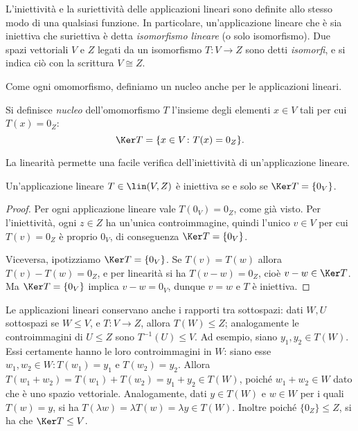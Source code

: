 L'iniettività e la suriettività delle applicazioni lineari sono definite allo stesso modo di una qualsiasi funzione.
In particolare, un'applicazione lineare che è sia iniettiva che suriettiva è detta \emph{isomorfismo lineare} (o solo isomorfismo).
Due spazi vettoriali $V$ e $Z$ legati da un isomorfismo $T\colon V\to Z$ sono detti \emph{isomorfi}, e si indica ciò con la scrittura $V\cong Z$.

Come ogni omomorfismo, definiamo un nucleo anche per le applicazioni lineari.
\begin{definizione} \label{d:nucleo-applicazione-lineare}
	Si definisce \emph{nucleo} dell'omomorfismo $T$ l'insieme degli elementi $x\in V$ tali per cui $T(x)=0_Z$:
	\begin{equation*}
		\Ker T=\{x\in V\colon T(x)=0_Z\}.
	\end{equation*}
\end{definizione}
La linearità permette una facile verifica dell'iniettività di un'applicazione lineare.
\begin{teorema} \label{t:iniettivita-nucleo}
	Un'applicazione lineare $T\in\lin(V,Z)$ è iniettiva se e solo se $\Ker T=\{0_V\}$.
\end{teorema}
\begin{proof}
	Per ogni applicazione lineare vale $T(0_V)=0_Z$, come già visto.
	Per l'iniettività, ogni $z\in Z$ ha un'unica controimmagine, quindi l'unico $v\in V$ per cui $T(v)=0_Z$ è proprio $0_V$, di conseguenza $\Ker T=\{0_V\}$.

	Viceversa, ipotizziamo $\Ker T=\{0_V\}$.
	Se $T(v)=T(w)$ allora $T(v)-T(w)=0_Z$, e per linearità si ha $T(v-w)=0_Z$, cioè $v-w\in\Ker T$.
	Ma $\Ker T=\{0_V\}$ implica $v-w=0_V$, dunque $v=w$ e $T$ è iniettiva.
\end{proof}
Le applicazioni lineari conservano anche i rapporti tra sottospazi: dati $W,U$ sottospazi se $W\leq V$, e $T\colon V\to Z$, allora $T(W)\leq Z$; analogamente le controimmagini di $U\leq Z$ sono $T^{-1}(U)\leq V$.
Ad esempio, siano $  y_1,  y_2\in T(W)$.
Essi certamente hanno le loro controimmagini in $W$: siano esse $  w_1,  w_2\in W\colon T(  w_1)=  y_1$ e $T(  w_2)=  y_2$.
Allora $T(  w_1+  w_2)=T(  w_1)+T(  w_2)=  y_1+  y_2\in T(W)$, poiché $  w_1+  w_2\in W$ dato che è uno spazio vettoriale.
Analogamente, dati $  y\in T(W)$ e $  w\in W$ per i quali $T(  w)=  y$, si ha $T(\lambda  w)=\lambda T(  w)=\lambda  y\in T(W)$.
Inoltre poiché $\{0_Z\}\leq Z$, si ha che $\Ker T\leq V$.

